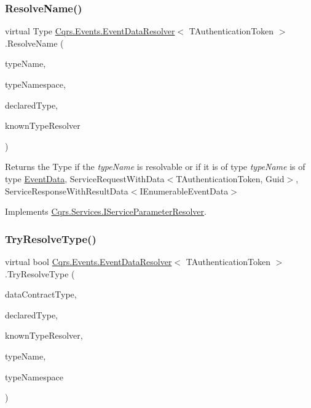 \subsubsection{\texorpdfstring{Resolve\+Name()}{ResolveName()}}
{\footnotesize\ttfamily virtual Type \hyperlink{classCqrs_1_1Events_1_1EventDataResolver}{Cqrs.\+Events.\+Event\+Data\+Resolver}$<$ T\+Authentication\+Token $>$.Resolve\+Name (\begin{DoxyParamCaption}\item[{string}]{type\+Name,  }\item[{string}]{type\+Namespace,  }\item[{Type}]{declared\+Type,  }\item[{Data\+Contract\+Resolver}]{known\+Type\+Resolver }\end{DoxyParamCaption})\hspace{0.3cm}{\ttfamily [virtual]}}



Returns the Type if the {\itshape type\+Name}  is resolvable or if it is of type {\itshape type\+Name}  is of type \hyperlink{classCqrs_1_1Events_1_1EventData}{Event\+Data}, Service\+Request\+With\+Data$<$\+T\+Authentication\+Token, Guid$>$, Service\+Response\+With\+Result\+Data$<$\+I\+Enumerable\+Event\+Data$>$ 



Implements \hyperlink{interfaceCqrs_1_1Services_1_1IServiceParameterResolver_a37c4b53616192e4e2f15ab4661ab99ae_a37c4b53616192e4e2f15ab4661ab99ae}{Cqrs.\+Services.\+I\+Service\+Parameter\+Resolver}.

\mbox{\label{classCqrs_1_1Events_1_1EventDataResolver_a62be7cd15bb38f3a4054a62e787c473d_a62be7cd15bb38f3a4054a62e787c473d}} 
\subsubsection{\texorpdfstring{Try\+Resolve\+Type()}{TryResolveType()}}
{\footnotesize\ttfamily virtual bool \hyperlink{classCqrs_1_1Events_1_1EventDataResolver}{Cqrs.\+Events.\+Event\+Data\+Resolver}$<$ T\+Authentication\+Token $>$.Try\+Resolve\+Type (\begin{DoxyParamCaption}\item[{Type}]{data\+Contract\+Type,  }\item[{Type}]{declared\+Type,  }\item[{Data\+Contract\+Resolver}]{known\+Type\+Resolver,  }\item[{out Xml\+Dictionary\+String}]{type\+Name,  }\item[{out Xml\+Dictionary\+String}]{type\+Namespace }\end{DoxyParamCaption})\hspace{0.3cm}{\ttfamily [virtual]}}



